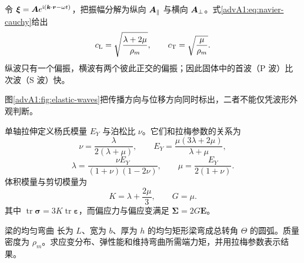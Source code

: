 {令 $\bm{\xi}=\bm{A} e^{\mathrm i(\bm{k}\cdot\bm{r}-\omega t)}$，把振幅分解为纵向
$\bm{A}_\parallel$ 与横向 $\bm{A}_\perp$。式\eqref{advA1:eq:navier-cauchy}给出
\[
 c_{\rm L}=\sqrt{\frac{\lambda+2\mu}{\rho_m}},
 \qquad
 c_{\rm T}=\sqrt{\frac{\mu}{\rho_m}}.
\]
纵波只有一个偏振，横波有两个彼此正交的偏振；因此固体中的首波（P 波）比次波（S 波）快。
\begin{center}\begin{minipage}{\linewidth}\centering
{}
\label{advA1:fig:elastic-waves}
\end{minipage}\end{center}
图\ref{advA1:fig:elastic-waves}把传播方向与位移方向同时标出，二者不能仅凭波形外观判断。

单轴拉伸定义杨氏模量 $E_Y$ 与泊松比 $\nu$。它们和拉梅参数的关系为
\[
 \nu=\frac{\lambda}{2(\lambda+\mu)},\qquad
 E_Y=\frac{\mu(3\lambda+2\mu)}{\lambda+\mu},
\]
\[
 \lambda=\frac{\nu E_Y}{(1+\nu)(1-2\nu)},\qquad
 \mu=\frac{E_Y}{2(1+\nu)}.
\]
体积模量与剪切模量为
\[
 K=\lambda+\frac{2\mu}{3},\qquad G=\mu.
\]
其中
$\operatorname{tr}\bm\sigma=3K\operatorname{tr}\bm\varepsilon$，而偏应力与偏应变满足
$\bm\Sigma=2G\bm E$。

\begin{advexamplebox}{梁的均匀弯曲}\label{advA1:ex:beam-bending}
长为 $L$、宽为 $b$、厚为 $h$ 的均匀矩形梁弯成总转角 $\Theta$ 的圆弧。质量密度为
$\rho_m$。求应变分布、弹性能和维持弯曲所需端力矩，并用拉梅参数表示结果。


\end{advexamplebox}}
